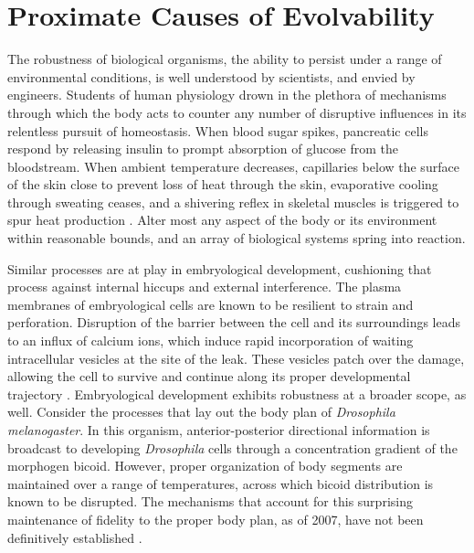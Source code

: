\chapter{Proximate Causes of Evolvability} \label{sec:proximate}

The robustness of biological organisms, the ability to persist under a range of environmental conditions, is well understood by scientists, and envied by engineers.
Students of human physiology drown in the plethora of mechanisms through which the body acts to counter any number of disruptive influences in its relentless pursuit of homeostasis.
When blood sugar spikes, pancreatic cells respond by releasing insulin to prompt absorption of glucose from the bloodstream. When ambient temperature decreases, capillaries below the surface of the skin close to prevent loss of heat through the skin, evaporative cooling through sweating ceases, and a shivering reflex in skeletal muscles is triggered to spur heat production \cite{Guyton1971BasicDisease, Benzinger1969HeatMan.}.
Alter most any aspect of the body or its environment within reasonable bounds, and an array of biological systems spring into reaction.

Similar processes are at play in embryological development, cushioning that process against internal hiccups and external interference.
The plasma membranes of embryological cells are known to be resilient to strain and perforation.
Disruption of the barrier between the cell and its surroundings leads to an influx of calcium ions, which induce rapid incorporation of waiting intracellular vesicles at the site of the leak.
These vesicles patch over the damage, allowing the cell to survive and continue along its proper developmental trajectory \cite{Hamdoun2007EmbryoWorld.}.
Embryological development exhibits robustness at a broader scope, as well.
Consider the processes that lay out the body plan of \textit{Drosophila melanogaster}.
In this organism, anterior-posterior directional information is broadcast to developing \textit{Drosophila} cells through a concentration gradient of the morphogen bicoid.
However, proper organization of body segments are maintained over a range of temperatures, across which bicoid distribution is known to be disrupted.
The mechanisms that account for this surprising maintenance of fidelity to the proper body plan, as of 2007, have not been definitively established \cite{Hamdoun2007EmbryoWorld.}.

